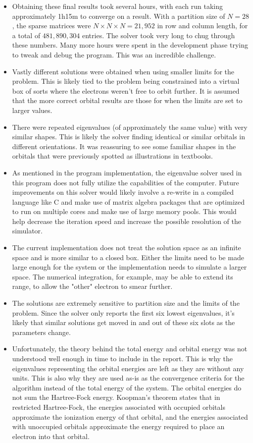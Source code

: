 \documentclass[10pt, oneside, letterpaper]{article}
\begin{document}
\begin{itemize}
    \item Obtaining these final results took several hours, with each run taking approximately 1h15m to converge on a result. With a partition size of $N=28$, the sparse matrices were $N \times N \times N = 21,952$ in row and column length, for a total of $481,890,304$ entries. The solver took very long to chug through these numbers. Many more hours were spent in the development phase trying to tweak and debug the program. This was an incredible challenge.
    \item Vastly different solutions were obtained when using smaller limits for the problem. This is likely tied to the problem being constrained into a virtual box of sorts where the electrons weren't free to orbit further. It is assumed that the more correct orbital results are those for when the limits are set to larger values.
    \item There were repeated eigenvalues (of approximately the same value) with very similar shapes. This is likely the solver finding identical or similar orbitals in different orientations. It was reassuring to see some familiar shapes in the orbitals that were previously spotted as illustrations in textbooks.
    \item As mentioned in the program implementation, the eigenvalue solver used in this program does not fully utilize the capabilities of the computer. Future improvements on this solver would likely involve a re-write in a compiled language like C and make use of matrix algebra packages that are optimized to run on multiple cores and make use of large memory pools. This would help decrease the iteration speed and increase the possible resolution of the simulator.
    \item The current implementation does not treat the solution space as an infinite space and is more similar to a closed box. Either the limits need to be made large enough for the system or the implementation needs to simulate a larger space. The numerical integration, for example, may be able to extend its range, to allow the "other" electron to smear further.
    \item The solutions are extremely sensitive to partition size and the limits of the problem. Since the solver only reports the first six lowest eigenvalues, it's likely that similar solutions get moved in and out of these six slots as the parameters change.
    \item Unfortunately, the theory behind the total energy and orbital energy was not understood well enough in time to include in the report. This is why the eigenvalues representing the orbital energies are left as they are without any units. This is also why they are used as-is as the convergence criteria for the algorithm instead of the total energy of the system. The orbital energies do not sum the Hartree-Fock energy. Koopman's theorem states that in restricted Hartree-Fock, the energies associated with occupied orbitals approximate the ionization energy of that orbital, and the energies associated with unoccupied orbitals approximate the energy required to place an electron into that orbital.
\end{itemize}
\end{document}
